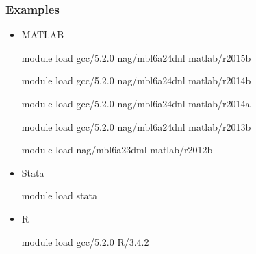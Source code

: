 \documentclass{beamer}
\begin{document}
\begin{frame}
\frametitle{Examples}
\begin{itemize}
\item MATLAB \vspace{0.2cm}
\begin{semiverbatim}
module load gcc/5.2.0 nag/mbl6a24dnl matlab/r2015b
\end{semiverbatim} \vspace{-0.4cm}
\begin{semiverbatim}
module load gcc/5.2.0 nag/mbl6a24dnl matlab/r2014b
\end{semiverbatim} \vspace{-0.4cm}
\begin{semiverbatim}
module load gcc/5.2.0 nag/mbl6a24dnl matlab/r2014a
\end{semiverbatim} \vspace{-0.4cm}
\begin{semiverbatim}
module load gcc/5.2.0 nag/mbl6a24dnl matlab/r2013b
\end{semiverbatim} \vspace{-0.4cm}
\begin{semiverbatim}
module load nag/mbl6a23dml matlab/r2012b
\end{semiverbatim} 
\item Stata \vspace{0.2cm}
\begin{semiverbatim}
module load stata
\end{semiverbatim} 
\item R \vspace{0.2cm}
\begin{semiverbatim}
module load gcc/5.2.0 R/3.4.2 
\end{semiverbatim}
\end{itemize}
\end{frame}
\end{document}
